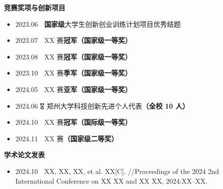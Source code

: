 \begin{frame}
    \vspace{-0.3em}

    \begin{block}{\textbf{竞赛奖项与创新项目}}
        \vspace{-0.5em}

        \begin{itemize}
                \small
            \item \textcolor{zzu!50}{2023.06} 🚀 \textcolor{zzu}{\textbf{国家级}}大学生创新创业训练计划项目优秀结题
            \item \textcolor{zzu!50}{2023.07} 🥇 XX 赛\textcolor{zzu}{\textbf{冠军（国家级一等奖）}}
            \item \textcolor{zzu!50}{2023.08} 🥇 XX 赛\textcolor{zzu}{\textbf{冠军（国家级一等奖）}}
            \item \textcolor{zzu!50}{2023.10} 🥉 XX 赛\textcolor{zzu}{\textbf{季军（国家级一等奖）}}
            \item \textcolor{zzu!50}{2024.05} 🥈 XX 赛\textcolor{zzu}{\textbf{亚军（国家级一等奖）}}
            \item \textcolor{zzu!50}{2024.06} 🎖️ 郑州大学科技创新先进个人代表\textcolor{zzu}{\textbf{（全校 10 人）}}
            \item \textcolor{zzu!50}{2024.10} 🥇 XX 赛\textcolor{zzu}{\textbf{冠军（国际级一等奖）}}
            \item \textcolor{zzu!50}{2024.11} 🏅 XX 赛\textcolor{zzu}{\textbf{（国家级二等奖）}}
        \end{itemize}
    \end{block}

    \vspace{-0.8em}

    \begin{block}{\textbf{学术论文发表}}
        \vspace{-0.5em}

        \begin{itemize}
                \small
            \item \textcolor{zzu!50}{2024.10} 📰 XX, XX, XX, et al. XX[C]. //Proceedings of the 2024 2nd International Conference on XX XX and XX XX, 2024:XX–XX.
        \end{itemize}
    \end{block}
\end{frame}
